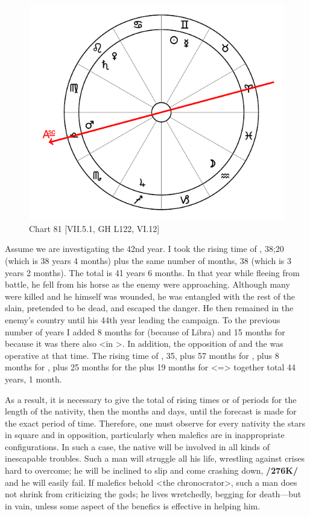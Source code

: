 \begin{figure}
\centering
\vspace{-10pt}
\includegraphics[width=.68\textwidth]{charts/7_5_1}
\caption{Chart 81 [VII.5.1, GH L122, VI.12]}
\label{fig:chart81}
\end{figure} 

Assume we are investigating the 42nd year. I took the rising time of \Libra, 38;20 (which is 38 years 4 months) plus the same number of months, 38 (which is 3 years 2 months). The total is 41 years 6 months. In that year while fleeing from battle, he fell from his horse as the enemy were approaching. Although many were killed and he himself was wounded, he was entangled with the rest of the slain, pretended to be dead, and escaped the danger. He then remained in the enemy’s country until his 44th year leading the campaign. To the previous number of years I added 8 months for \Venus\xspace (because of Libra) and 15 months for \Mars\xspace because it was there also <in \Libra>. In addition, the opposition of \Saturn\xspace and the \Moon\xspace was operative at that time. The rising time of \Leo, 35, plus 57 months for \Saturn, plus 8 months for \Venus, plus 25 months for the \Moon\xspace plus 19 months for \Leo\xspace <=\Sun> together total 44 years, 1 month. 

As a result, it is necessary to give the total of rising times or of periods for the length of the nativity, then the months and days, until the forecast is made for the exact period of time. Therefore, one must observe for every nativity the stars in square and in opposition, particularly when malefics are in inappropriate configurations. In such a case, the native will be involved in all kinds of inescapable troubles. Such a man will struggle all his life, wrestling against crises hard to overcome; he will be inclined to slip and come crashing down, \textbf{/276K/} and he will easily fail. If malefics behold <the chronocrator>, such a man does not shrink from criticizing the gods; he lives wretchedly, begging for death—but in vain, unless some aspect of the benefics is effective in helping him. 

